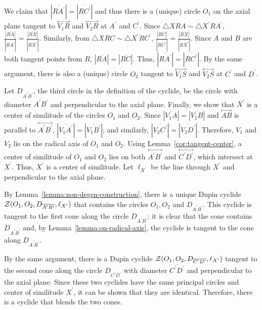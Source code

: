 We claim that $|\overline{RA^\prime}|=|\overline{RC^\prime}|$
and thus there is a (unique) circle $O_1$ on the axial plane 
tangent to $\stackrel{\longleftrightarrow}{V_1R}$ and 
$\stackrel{\longleftrightarrow}{V_2R}$ at $A^\prime$ and $C^\prime$.
Since $\bigtriangleup XRA \sim\bigtriangleup X^\prime RA^\prime$,
$\frac{|\overline{RA}|}{|\overline{RA^\prime}|}=
\frac{|\overline{RX}|}{|\overline{RX^\prime}|}$.
Similarly, from
$\bigtriangleup XRC \sim \bigtriangleup X^\prime RC^\prime$, 
$\frac{|\overline{RC}|}{|\overline{RC^\prime}|}=
\frac{|\overline{RX}|}{|\overline{RX^\prime}|}$.
Since $A$ and $B$ are both tangent points from $R$, 
$|\overline{RA}|=|\overline{RC}|$.
Thus, $|\overline{RA^\prime}|=|\overline{RC^\prime}|$.
By the same argument, there is also a (unique) circle 
$O_2$ tangent to $\stackrel{\longleftrightarrow}{V_1S}$ and
$\stackrel{\longleftrightarrow}{V_2S}$ at $C^\prime$ and $D^\prime$.

Let $D_{\overline{A^\prime B^\prime}}$, the third circle in the definition of
the cyclide, be the circle with diameter
$\overline{A^\prime B^\prime}$ and perpendicular to the axial plane.
Finally, we show that $X^\prime$ is a center of similitude
of the circles $O_1$ and $O_2$.
Since $|\overline{V_1A}|=|\overline{V_1B}|$ and
$\stackrel{\longleftrightarrow}{AB}$ is parallel to
$\stackrel{\longleftrightarrow}{A^\prime B^\prime}$,
$|\overline{V_1A^\prime}|=|\overline{V_1B^\prime}|$; and similarly,
$|\overline{V_2C^\prime}|=|\overline{V_2D^\prime}|$.
Therefore, $V_1$ and $V_2$ lie on the radical axis of $O_1$ and $O_2$.
Using Lemma~\ref{cor:tangent-center}, a center of similitude of 
$O_1$ and $O_2$ lies on both 
$\stackrel{\longleftrightarrow}{A^\prime B^\prime}$ and
$\stackrel{\longleftrightarrow}{C^\prime D^\prime}$,
which intersect at $X^\prime$.
Thus, $X^\prime$ is a center of similitude.
Let $\ell_{X^\prime}$ be the line through $X^\prime$ and perpendicular to the 
axial plane. 

By Lemma~\ref{lemma:non-degen-construction}, there is a unique 
Dupin cyclide
${\cal Z}(O_1,O_2,D_{\overline{A^\prime B^\prime}},\ell_{X^\prime})$
that contains the circles $O_1, O_2$ and $D_{\overline{A^\prime B^\prime}}$.
This cyclide is tangent to the first cone along the circle 
$D_{\overline{A^\prime B^\prime}}$:
it is clear that the cone contains $D_{\overline{A^\prime B^\prime}}$
and, by Lemma~\ref{lemma:on-radical-axis}, 
the cyclide is tangent to the cone along 
$D_{\overline{A^\prime B^\prime}}$.

By the same argument, there is a Dupin cyclide
${\cal Z}(O_1,O_2,D_{\overline{C^\prime D^\prime}},\ell_{X^\prime})$
tangent to the second cone along the circle $D_{\overline{C^\prime D^\prime}}$ 
with diameter 
$\overline{C^\prime D^\prime}$ and perpendicular to the axial plane.
Since these two cyclides have the same principal circles and center of
similitude $X^\prime$, it can be shown that they are identical.
Therefore, there is a cyclide that blends the two cones.
\QED

